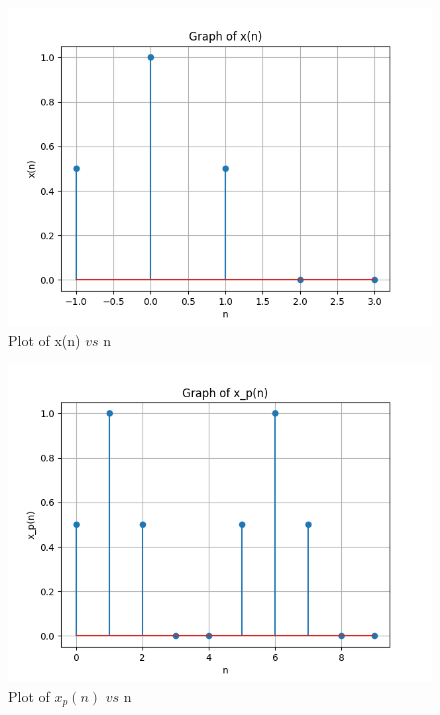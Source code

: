 \documentclass[journal,12pt,twocolumn]{IEEEtran}
\theoremstyle{remark}
\begin{document}
\begin{figure}[ht]
    \centering
    \includegraphics[width=\columnwidth]{figs/Figure_1.png}
    \caption{Plot of x(n) $vs$ n}
    \label{fig:50.1}
\end{figure}
\begin{figure}[ht]
    \centering
    \includegraphics[width=\columnwidth]{figs/Figure_2.png}
    \caption{Plot of $x_p(n)$ $vs$ n}
    \label{fig:50.2}
\end{figure}
\end{document}
